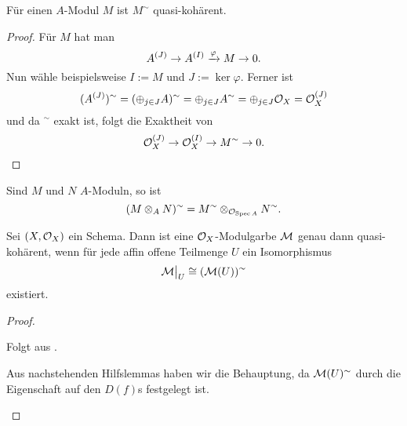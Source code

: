\begin{korollar}
    \label{kor:m a modul dann m sim quaiskohaerent}
    Für einen $A$-Modul $M$ ist $M^\sim$ quasi-kohärent.
\end{korollar}
\begin{proof}
    Für $M$ hat man
    \[ A^{(J)} \to A^{(I)} \xrightarrow\varphi M \to 0.\]
    Nun wähle beispielsweise $I := M$ und $J := \ker\varphi$.
    Ferner ist 
    \[ (A^{(J)})^\sim = (\oplus_{j\in J}A)^\sim = \oplus_{j\in J}
        A^\sim = \oplus_{j  \in J} \mathcal{O}_X = \mathcal{O}_X^{(J)}\]
    und da $^\sim$ exakt ist, folgt die Exaktheit von
    \[ \mathcal{O}_X^{(J)} \to \mathcal{O}_X^{(I)} \to M^\sim \to 0.\] 
\end{proof}

\begin{bemerkung}
    Sind $M$ und $N$ $A$-Moduln, so ist
    \[ (M\otimes_A N)^\sim = M^\sim \otimes_{\mathcal{O}_{\operatorname{Spec} A}} N^\sim.\]
\end{bemerkung}

\begin{satz}
    \label{satz:modulgarbe quasikohaerent <=> iso auf einschraenkung}
    Sei $(X,\mathcal{O}_X)$ ein Schema. Dann ist eine $\mathcal{O}_X$-Modulgarbe $\mathcal{M}$
    genau dann quasi-kohärent, wenn für jede affin offene Teilmenge
    $U$ ein Isomorphismus
    \[ \mathcal{M}\big|_{U} \cong (\mathcal{M}(U))^\sim\]
    existiert.
\end{satz}
\begin{proof}
    \begin{description mathquote}
    \item[\Leftarrow] Folgt aus .
    \item[\Rightarrow]
        Aus nachstehenden Hilfslemmas haben wir die Behauptung, da
        $\mathcal{M}(U)^\sim$ durch die Eigenschaft auf den $D(f)$s festgelegt ist.
    \end{description mathquote}
\end{proof}

